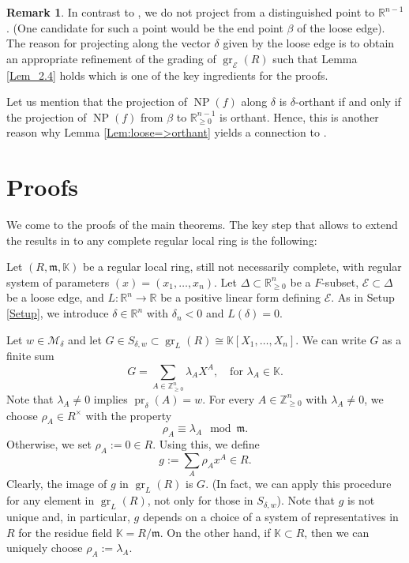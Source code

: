 \documentclass[11pt]{amsart}
\theoremstyle{plain}
\theoremstyle{definition}
\newtheorem{Rk}[Thm]{Remark}
\numberwithin{equation}{section}
\newcommand{\pr}{\operatorname{pr}}
\newcommand{\gr}{\operatorname{gr}}
\newcommand{\NP}{\operatorname{NP}}
\renewcommand{\b}{\beta}
\renewcommand{\d}{\delta}
\renewcommand{\l}{\lambda}
\renewcommand{\r}{\rho}
\newcommand{\D}{\Delta}
\newcommand{\KK}{{\mathbb K}}
\newcommand{\RR}{\mathbb R}
\newcommand{\ZZ}{{\mathbb Z}}
\newcommand{\cE}{\mathcal{E}}
\newcommand{\cM}{\mathcal{M}}
\newcommand{\fm}{\mathfrak m}
\newcommand{\gqz}{{\geq 0}}
\renewcommand{\(}{(\!(}
\renewcommand{\)}{)\!)}
\begin{document}
\begin{Rk}
	In contrast to \cite{RS}, we do not project from a distinguished point to $ \RR^{n-1} $. 
	(One candidate for such a point would be the end point $ \b $ of the loose edge).
	The reason for projecting along the vector $ \d $ given by the loose edge is to obtain an appropriate refinement of the grading of $ \gr_\cE(R) $ such that Lemma \ref{Lem_2.4} holds which is one of the key ingredients for the proofs.
	
	Let us mention that the projection of $ \NP(f) $ along $ \d $ is $ \d $-orthant 
	if and only if the projection of $ \NP(f) $ from $ \b $ to $ \RR^{n-1}_\gqz $ is orthant.
	Hence, this is another reason why Lemma \ref{Lem:loose=>orthant} yields a connection to \cite{RS}.
\end{Rk}


















\smallskip 	

\section{Proofs}

We come to the proofs of the main theorems. 
The key step that allows to extend the results in \cite{GH} to any complete regular local ring is the following:

\smallskip 

Let
$ (R, \fm , \KK ) $ be a regular local ring, still not necessarily complete, with regular system of parameters $ (x) = (x_1, \ldots, x_n) $.
Let $ \D \subset \RR^n_\gqz $ be a $ F $-subset, $ \cE \subset \D $ be a loose edge, and $ L : \RR^n \to \RR $ be a positive linear form defining $ \cE $.
As in Setup \ref{Setup}, we introduce $ \d \in \RR^n $ with $ \d_n < 0 $ and $ L(\d)= 0 $.

Let $ w \in \cM_\d $ and let $ G \in S_{\d,w} \subset \gr_L(R) \cong \KK[X_1, \ldots, X_n] $.
We can write $ G $ as a finite sum
\[
	G = \sum_{A \in \ZZ^n_\gqz} \l_A X^A,
	\ \ \ \mbox{ for } \l_A \in \KK.
\]
Note that $ \l_A \neq 0 $ implies $ \pr_\d (A) = w $.
For every $ A \in \ZZ_\gqz^n $ with $ \l_A \neq 0 $, we choose $ \r_A \in R^\times $ with the property 
\[
	\r_A \equiv \l_A \mod \fm. 
\]
Otherwise, we set $ \r_A := 0 \in R $.
Using this, we define 
\[
	g := \sum_{A} \r_A x^A \in R.
\]
Clearly, the image of $ g $ in $ \gr_L(R) $ is $ G $.
(In fact, we can apply this procedure for any element in $ \gr_L(R) $, not only for those in $ S_{\d, w} $).
Note that $ g $ is not unique and, in particular, $ g $ depends on a choice of a system of representatives in $ R $ for the residue field $ \KK = R/\fm $.
On the other hand, if $ \KK \subset R $, then we can uniquely choose $ \r_A := \l_A $.
\end{document}
